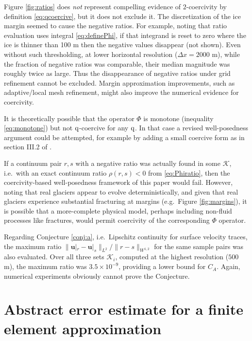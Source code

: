 \documentclass[hidelinks,onefignum,onetabnum,final]{siamart220329}  %
\newcommand{\bu}{\mathbf{u}}
\newcommand{\cK}{\mathcal{K}}
\newcommand{\qq}{{\text{\textnormal{q}}}}
\begin{document}
Figure \ref{fig:ratios} does \emph{not} represent compelling evidence of $2$-coercivity by definition \eqref{eq:qcoercive}, but it does not exclude it.  The discretization of the ice margin seemed to cause the negative ratios.  For example, noting that ratio evaluation uses integral \eqref{eq:definePhi}, if that integrand is reset to zero where the ice is thinner than 100 m then the negative values disappear (not shown).  Even without such thresholding, at lower horizontal resolution ($\Delta x=2000$ m), while the fraction of negative ratios was comparable, their median magnitude was roughly twice as large.  Thus the disappearance of negative ratios under grid refinement cannot be excluded.  Margin approximation improvements, such as adaptive/local mesh refinement, might also improve the numerical evidence for coercivity.

It is theoretically possible that the operator $\Phi$ is monotone (inequality \ref{eq:monotone}) but not $\qq$-coercive for any $\qq$.  In that case a revised well-posedness argument could be attempted, for example by adding a small coercive form as in section III.2 of \cite{KinderlehrerStampacchia1980}.

If a continuum pair $r,s$ with a negative ratio was actually found in some $\cK$, i.e.~with an exact continuum ratio $\rho(r,s)<0$ from \eqref{eq:Phiratio}, then the coercivity-based well-posedness framework of this paper would fail.  However, noting that real glaciers appear to evolve deterministically, and given that real glaciers experience substantial fracturing at margins (e.g.~Figure \ref{fig:margins}), it is possible that a more-complete physical model, perhaps including non-fluid processes like fractures, would permit coercivity of the corresponding $\Phi$ operator.

Regarding Conjecture \ref{conj:a}, i.e.~Lipschitz continuity for surface velocity traces, the maximum ratio $\big\|\bu|_r - \bu|_s\big\|_{L^2}/\|r-s\|_{W^{1,2}}$ for the same sample pairs was also evaluated.  Over all three sets $\cK_i$, computed at the highest resolution ($500$ m), the maximum ratio was $3.5\times 10^{-9}$, providing a lower bound for $C_A$.  Again, numerical experiments obviously cannot prove the Conjecture.


\section{Abstract error estimate for a finite element approximation} \label{sec:abstractestimate}
\end{document}
